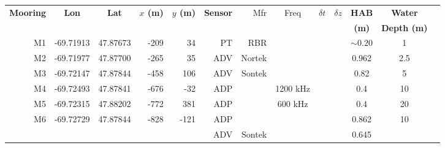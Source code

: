 \documentclass[letterpaper,10pt,landscape]{article}
\begin{document}
\thispagestyle{empty}



\begin{table}
  \centering
  \begin{tabular}{|r|c|c|r|r|r|r|c|c|c|c|c|c|} \hline
    {\bf Mooring}       & {\bf Lon}                  & {\bf Lat}                 & {\bf $x$ (m)}          & {\bf $y$ (m)}         & {\bf Sensor} &Mfr       & Freq     & $\delta t$&$\delta z$& {\bf HAB}  & {\bf Water}         \\
    ~                   &                            &                           &                        &                       &              &          &          &           &          & {\bf (m)}  & {\bf Depth (m)}     \\\hline \hline
    M1                  & -69.71913                  & 47.87673                  & -209                   & 34                    & PT           & RBR      &          &           &          & $\sim0.20$ & 1                   \\\hline
    M2                  & -69.71977                  & 47.87700                  & -265                   & 35                    & ADV          & Nortek   &          &           &          & 0.962      & 2.5                 \\\hline %
    M3                  & -69.72147                  & 47.87844                  & -458                   & 106                   & ADV          & Sontek   &          &           &          & 0.82       & 5                   \\\hline
    M4                  & -69.72493                  & 47.87841                  & -676                   & -32                   & ADP          &          & 1200 kHz &           &          & 0.4        & 10                  \\\hline
    M5                  & -69.72315                  & 47.88202                  & -772                   & 381                   & ADP          &          &  600 kHz &           &          & 0.4        & 20                  \\\hline
    \multirow{4}{*}{M6} & \multirow{4}{*}{-69.72729} & \multirow{4}{*}{47.87844} & \multirow{4}{*}{-828}  & \multirow{4}{*}{-121} & ADP          &          &          &           &          & 0.862      & \multirow{4}{*}{10} \\ 
    ~                   &                            &                           &                        &                       & ADV          & Sontek   &          &           &          & 0.645      &                     \\ 

\end{tabular}
\end{table}
\end{document}
